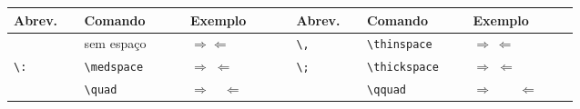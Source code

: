 % 
% 
% 
% 
% 
\begin{tabular}{>{\centering}p{0.1\linewidth}<{\centering}>{\centering}p{0.15\linewidth}<{\centering}>{\centering}p{0.15\linewidth}<{\centering}|>{\centering}p{0.1\linewidth}<{\centering}>{\centering}p{0.15\linewidth}<{\centering}>{\centering}p{0.15\linewidth}<{\centering}}
    \hline
    Abrev. & Comando & Exemplo & Abrev. & Comando & Exemplo \tabularnewline \hline
    & sem espa\c{c}o & $\Rightarrow \Leftarrow$ & \lstinline!\,! & \lstinline!\thinspace! & $\Rightarrow \, \Leftarrow$ \tabularnewline
    \lstinline!\:! & \lstinline!\medspace! & $\Rightarrow \; \Leftarrow$ & \lstinline!\;! & \lstinline!\thickspace! & $\Rightarrow \; \Leftarrow$ \tabularnewline
    & \lstinline!\quad! & $\Rightarrow \quad \Leftarrow$ & & \lstinline!\qquad! & $\Rightarrow \qquad \Leftarrow$ \tabularnewline \hline
\end{tabular}
